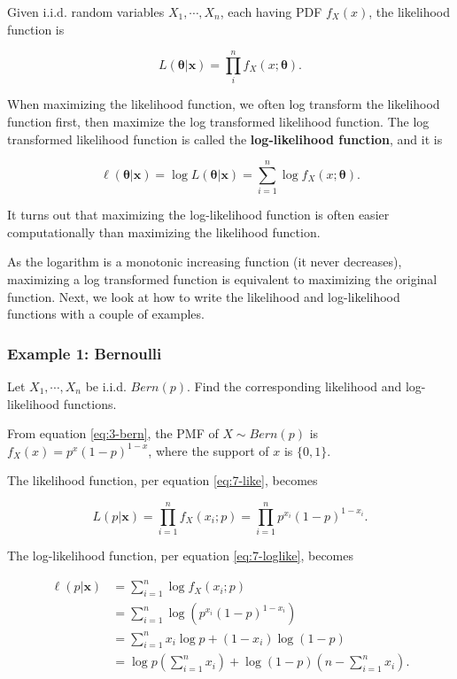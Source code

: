 \documentclass[
]{book}
\begin{document}
Given i.i.d. random variables \(X_1, \cdots, X_n\), each having PDF \(f_X(x)\), the likelihood function is

\begin{equation} 
L(\boldsymbol{\theta} | \boldsymbol{x} ) = \prod_i^n f_X(x; \boldsymbol{\theta}).
\label{eq:7-like}
\end{equation}

When maximizing the likelihood function, we often log transform the likelihood function first, then maximize the log transformed likelihood function. The log transformed likelihood function is called the \textbf{log-likelihood function}, and it is

\begin{equation} 
\ell(\boldsymbol{\theta} | \boldsymbol{x}) = \log L(\boldsymbol{\theta} | \boldsymbol{x}) = \sum_{i=1}^n \log f_X(x; \boldsymbol{\theta}).
\label{eq:7-loglike}
\end{equation}

It turns out that maximizing the log-likelihood function is often easier computationally than maximizing the likelihood function.

As the logarithm is a monotonic increasing function (it never decreases), maximizing a log transformed function is equivalent to maximizing the original function. Next, we look at how to write the likelihood and log-likelihood functions with a couple of examples.

\subsubsection{Example 1: Bernoulli}\label{example-1-bernoulli}

Let \(X_1, \cdots, X_n\) be i.i.d. \(Bern(p)\). Find the corresponding likelihood and log-likelihood functions.

From equation \eqref{eq:3-bern}, the PMF of \(X \sim Bern(p)\) is \(f_X(x) = p^x (1-p)^{1-x}\), where the support of \(x\) is \(\{0,1\}\).

The likelihood function, per equation \eqref{eq:7-like}, becomes

\[
L(p | \boldsymbol{x} ) = \prod_{i=1}^n f_X(x_i; p) = \prod_{i=1}^n p^{x_i} (1-p)^{1-x_i}.
\]

The log-likelihood function, per equation \eqref{eq:7-loglike}, becomes

\[
\begin{split}
\ell (p | \boldsymbol{x}) &= \sum_{i=1}^n \log f_X(x_i;p) \\
                          &= \sum_{i=1}^n \log \left( p^{x_i} (1-p)^{1-x_i} \right) \\
                          &= \sum_{i=1}^n x_i \log p + (1-x_i) \log (1-p) \\
                          &= \log p \left(\sum_{i=1}^n x_i \right) + \log (1-p) \left( n - \sum_{i=1}^n x_i \right).
\end{split}
\]
\end{document}
